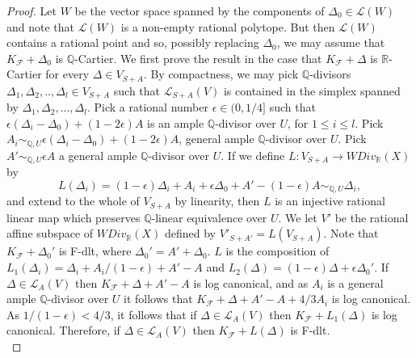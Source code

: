\documentclass[12pt]{amsart}%
\theoremstyle{plain}
\theoremstyle{remark}
\theoremstyle{definition}
\newcommand{\<}{\leq}
\newcommand{\mbQ}{\mathbb{Q}}
\newcommand{\mbR}{\mathbb{R}}
\theoremstyle{definition}
\theoremstyle{definition}
\numberwithin{equation}{section}
\theoremstyle{remark}
\begin{document}
\begin{proof}
Let $W$ be the vector space spanned by the components of $\Delta_0\in \mathcal{L}(W)$ and note that $\mathcal{L}(W)$ is a non-empty rational polytope. But then $\mathcal{L}(W)$ contains a rational point and so, possibly replacing $\Delta_0$, we may assume that $K_{\mathcal{F}}+\Delta_0$ is $\mbQ$-Cartier. We first prove the result in the case that $K_{\mathcal{F}}+\Delta$ is $\mbR$-Cartier for every $\Delta\in V_{S+A}$. By compactness, we may pick $\mbQ$-divisors $\Delta_1,\Delta_2,..,\Delta_l\in V_{S+A}$ such that $\mathcal{L}_{S+A}(V)$ is contained in the simplex spanned by $\Delta_1,\Delta_2,...,\Delta_l$. Pick a rational number $\epsilon\in (0,1/4]$ such that $\epsilon(\Delta_i-\Delta_0)+(1-2\epsilon)A$ is an ample $\mbQ$-divisor over $U$, for $1\leqslant i\leqslant l$. Pick $A_i\sim_{\mbQ,U}\epsilon(\Delta_i-\Delta_0)+(1-2\epsilon)A$, general ample $\mbQ$-divisor over $U$. Pick $A'\sim_{\mbQ,U}\epsilon A$ a general ample $\mbQ$-divisor over $U$. If we define $L:V_{S+A}\rightarrow WDiv_{\mbR}(X)$ by \[
L(\Delta_i)=(1-\epsilon)\Delta_i+A_i+\epsilon\Delta_0+A'-(1-\epsilon)A\sim_{\mbQ,U} \Delta_i,
\] 
and extend to the whole of $V_{S+A}$ by linearity, then $L$ is an injective rational linear map which preserves $\mbQ$-linear equivalence over $U$. We let $V'$ be the rational affine subspace of $WDiv_{\mbR}(X)$ defined by $V'_{S+A'}=L(V_{S+A})$. Note that $K_{\mathcal{F}}+\Delta_0'$ is F-dlt, where $\Delta_0'=A'+\Delta_0$. $L$ is the composition of $L_1(\Delta_i)=\Delta_i+A_i/(1-\epsilon)+A'-A$ and $L_2(\Delta)=(1-\epsilon)\Delta+\epsilon\Delta_0'$. If $\Delta\in \mathcal{L}_A(V)$ then $K_{\mathcal{F}}+\Delta+A'-A$ is log canonical, and as $A_i$ is a general ample $\mbQ$-divisor over $U$ it follows that $K_{\mathcal{F}}+\Delta+A'-A+4/3 A_i$ is log canonical. As $1/(1-\epsilon)<4/3$, it follows that if $\Delta\in \mathcal{L}_A(V)$ then $K_{\mathcal{F}}+L_1(\Delta)$ is log canonical. Therefore, if $\Delta\in \mathcal{L}_A(V)$ then $K_{\mathcal{F}}+L(\Delta)$ is F-dlt.\\

\end{proof}
\end{document}
